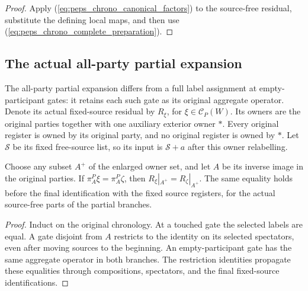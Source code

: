 \begin{proof}
    \leanok
    Apply (\ref{eq:peps_chrono_canonical_factors}) to the source-free residual,
    substitute the defining local maps, and then use
    (\ref{eq:peps_chrono_complete_preparation}).
\end{proof}

\subsection{The actual all-party partial expansion}

The all-party partial expansion differs from a full label assignment at
empty-participant gates: it retains each such gate as its original aggregate
operator. Denote its actual fixed-source residual by $R_\xi$, for
$\xi\in\mathcal C_P(W)$. Its owners are the original parties together with
one auxiliary exterior owner $\ast$. Every original register is owned by
its original party, and no original register is owned by $\ast$.
Let $\mathcal S$ be its fixed free-source list, so its input is
$\mathcal S\mathbin{+}a$ after this owner relabelling.

\begin{theorem}
    \label{thm:peps_chrono_partial_locality}
    \leanok
    Choose any subset $A^+$ of the enlarged owner set, and let $A$ be its inverse
    image in the original parties. If
    $\pi_A^P\xi=\pi_A^P\zeta$, then $R_\xi|_{A^+}=R_\zeta|_{A^+}$.
    The same equality holds before the final identification with the fixed
    source registers, for the actual source-free parts of the partial branches.
\end{theorem}

\begin{proof}
    \leanok
    Induct on the original chronology. At a touched gate the selected labels
    are equal. A gate disjoint from $A$ restricts to the identity on its selected
    spectators, even after moving sources to the beginning. An empty-participant
    gate has the same aggregate operator in both branches. The restriction
    identities propagate these equalities through compositions, spectators, and
    the final fixed-source identifications.
\end{proof}

